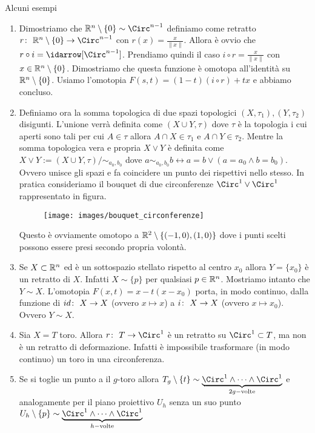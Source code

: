 \begin{remark}
	Alcuni esempi
	\begin{enumerate}
		\item Dimostriamo che $\R^n \setminus \{0\} \sim \Circ^{n-1}$ definiamo come retratto $\morphism{r}{\R^n \setminus \{0\}}{\Circ^{n-1}}$ con $r(x) = \frac{x}{\|x\|}$. Allora è ovvio che $r \circ i = \idarrow[\Circ^{n-1}]$. Prendiamo quindi il caso $i \circ r = \frac{x}{\|x\|}$ con $x \in \mathbb{R}^n  \setminus \{0\}$. Dimostriamo che questa funzione è omotopa all'identità su $\mathbb{R}^n \setminus \{0\}$. Usiamo l'omotopia $F(s,t) = (1-t)(i \circ r) + tx$ e abbiamo concluso.
		\item Definiamo ora la somma topologica di due spazi topologici $(X, \tau_1), (Y, \tau_2)$ disigunti. L'unione verrà definita come $(X \cup Y, \tau)$ dove $\tau$ è la topologia i cui aperti sono tali per cui $A \in \tau$ allora $A \cap X \in \tau_1$ e $A \cap Y \in \tau_2$. Mentre la somma topologica vera e propria $X \lor Y$ è definita come $X \lor Y := (X \cup Y, \tau) / \sim_{a_0, b_0}$ dove $ a \sim_{a_0, b_0} b \leftrightarrow a = b \lor (a = a_0 \land b = b_0)$. Ovvero unisce gli spazi e fa coincidere un punto dei rispettivi nello stesso. In pratica consideriamo il bouquet di due circonferenze $\Circ^1 \lor \Circ^1$ rappresentato in figura.
		
		\begin{figure}[h]
			\centering
			\texttt{[image: images/bouquet\_circonferenze]}
			\caption{}
			\label{fig:bouquetcirconferenze}
		\end{figure}
		Questo è ovviamente omotopo a $\mathbb{R}^2 \setminus \{(-1,0), (1,0)\}$ dove i punti scelti possono essere presi secondo propria volontà.
		\item Se $X \subset \mathbb{R}^n$ ed è un sottospazio stellato rispetto al centro $x_0$ allora $Y = \{x_0\}$ è un retratto di $X$. Infatti $X \sim \{p\}$ per qualsiasi $p \in \mathbb{R}^n$. Mostriamo intanto che $Y \sim X$. L'omotopia $F(x,t) = x - t(x-x_0)$ porta, in modo continuo, dalla funzione di $id \colon\ X \rightarrow X$ (ovvero $x \mapsto x$) a $i \colon\ X \rightarrow X$ (ovvero $x \mapsto x_0$). Ovvero $Y \sim X$.
		\item Sia $X = T$ toro. Allora $\morphism{r}{T}{\Circ^1}$ è un retratto su $\Circ^1 \subset T$, ma non è un retratto di deformazione. Infatti è impossibile trasformare (in modo continuo) un toro in una circonferenza. 
		\item Se si toglie un punto a il $g$-toro allora $T_g \setminus \{t\} \sim \underbrace{\Circ^1 \wedge \dots \wedge \Circ^1}_{2g-\text{volte}}$ e analogamente per il piano proiettivo $U_h$ senza un suo punto $U_h \setminus \{p\} \sim \underbrace{\Circ^1 \wedge \dots \wedge \Circ^1}_{h-\text{volte}}$
 	\end{enumerate}
\end{remark}

